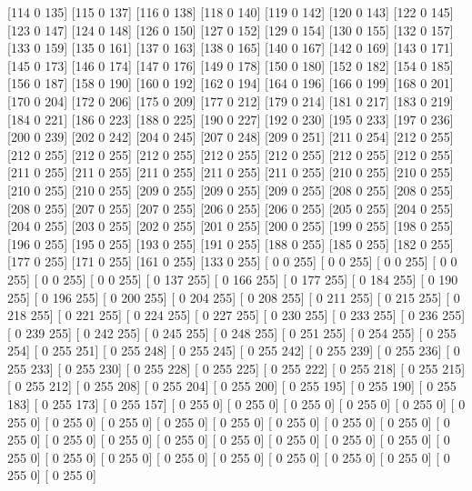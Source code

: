 [114   0 135]
[115   0 137]
[116   0 138]
[118   0 140]
[119   0 142]
[120   0 143]
[122   0 145]
[123   0 147]
[124   0 148]
[126   0 150]
[127   0 152]
[129   0 154]
[130   0 155]
[132   0 157]
[133   0 159]
[135   0 161]
[137   0 163]
[138   0 165]
[140   0 167]
[142   0 169]
[143   0 171]
[145   0 173]
[146   0 174]
[147   0 176]
[149   0 178]
[150   0 180]
[152   0 182]
[154   0 185]
[156   0 187]
[158   0 190]
[160   0 192]
[162   0 194]
[164   0 196]
[166   0 199]
[168   0 201]
[170   0 204]
[172   0 206]
[175   0 209]
[177   0 212]
[179   0 214]
[181   0 217]
[183   0 219]
[184   0 221]
[186   0 223]
[188   0 225]
[190   0 227]
[192   0 230]
[195   0 233]
[197   0 236]
[200   0 239]
[202   0 242]
[204   0 245]
[207   0 248]
[209   0 251]
[211   0 254]
[212   0 255]
[212   0 255]
[212   0 255]
[212   0 255]
[212   0 255]
[212   0 255]
[212   0 255]
[212   0 255]
[211   0 255]
[211   0 255]
[211   0 255]
[211   0 255]
[211   0 255]
[210   0 255]
[210   0 255]
[210   0 255]
[210   0 255]
[209   0 255]
[209   0 255]
[209   0 255]
[208   0 255]
[208   0 255]
[208   0 255]
[207   0 255]
[207   0 255]
[206   0 255]
[206   0 255]
[205   0 255]
[204   0 255]
[204   0 255]
[203   0 255]
[202   0 255]
[201   0 255]
[200   0 255]
[199   0 255]
[198   0 255]
[196   0 255]
[195   0 255]
[193   0 255]
[191   0 255]
[188   0 255]
[185   0 255]
[182   0 255]
[177   0 255]
[171   0 255]
[161   0 255]
[133   0 255]
[  0   0 255]
[  0   0 255]
[  0   0 255]
[  0   0 255]
[  0   0 255]
[  0   0 255]
[  0 137 255]
[  0 166 255]
[  0 177 255]
[  0 184 255]
[  0 190 255]
[  0 196 255]
[  0 200 255]
[  0 204 255]
[  0 208 255]
[  0 211 255]
[  0 215 255]
[  0 218 255]
[  0 221 255]
[  0 224 255]
[  0 227 255]
[  0 230 255]
[  0 233 255]
[  0 236 255]
[  0 239 255]
[  0 242 255]
[  0 245 255]
[  0 248 255]
[  0 251 255]
[  0 254 255]
[  0 255 254]
[  0 255 251]
[  0 255 248]
[  0 255 245]
[  0 255 242]
[  0 255 239]
[  0 255 236]
[  0 255 233]
[  0 255 230]
[  0 255 228]
[  0 255 225]
[  0 255 222]
[  0 255 218]
[  0 255 215]
[  0 255 212]
[  0 255 208]
[  0 255 204]
[  0 255 200]
[  0 255 195]
[  0 255 190]
[  0 255 183]
[  0 255 173]
[  0 255 157]
[  0 255   0]
[  0 255   0]
[  0 255   0]
[  0 255   0]
[  0 255   0]
[  0 255   0]
[  0 255   0]
[  0 255   0]
[  0 255   0]
[  0 255   0]
[  0 255   0]
[  0 255   0]
[  0 255   0]
[  0 255   0]
[  0 255   0]
[  0 255   0]
[  0 255   0]
[  0 255   0]
[  0 255   0]
[  0 255   0]
[  0 255   0]
[  0 255   0]
[  0 255   0]
[  0 255   0]
[  0 255   0]
[  0 255   0]
[  0 255   0]
[  0 255   0]
[  0 255   0]
[  0 255   0]
[  0 255   0]
